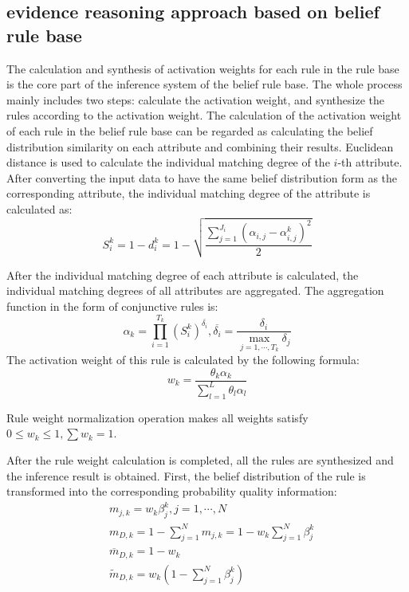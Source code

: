 \documentclass{ieeeaccess}
\begin{document}
\subsection{evidence reasoning approach based on belief rule base}
The calculation and synthesis of activation weights for each rule in the rule base is the core part of the inference system of the belief rule base.
The whole process mainly includes two steps: calculate the activation weight, and synthesize the rules according to the activation weight.
The calculation of the activation weight of each rule in the belief rule base can be regarded as calculating the belief distribution similarity on each attribute and combining their results.
Euclidean distance is used to calculate the individual matching degree of the $i$-th attribute. After converting the input data to have the same belief distribution form as the corresponding attribute,
the individual matching degree of the attribute is calculated as:
\begin{equation}
    S_i^k=1-d_i^k=1-\sqrt{\frac{\sum_{j=1}^{J_i}(\alpha_{i,j}-\alpha_{i,j}^k)^2}{2}}
\end{equation}

After the individual matching degree of each attribute is calculated, the individual matching degrees of all attributes are aggregated. The aggregation function in the form of conjunctive rules is:
\begin{equation}
    \alpha_k=\prod_{i=1}^{T_k}(S_i^k)^{\overline{\delta_i}},\overline{\delta_i}=\frac{\delta_i}{\max_{j=1,\cdots,T_k}\delta_j}
\end{equation}
The activation weight of this rule is calculated by the following formula:
\begin{equation}
    w_k=\frac{\theta_k\alpha_k}{\sum_{l=1}^L\theta_l\alpha_l}
\end{equation}

Rule weight normalization operation makes all weights satisfy $0\leq w_k\leq 1,\sum w_k=1$.

After the rule weight calculation is completed, all the rules are synthesized and the inference result is obtained.
First, the belief distribution of the rule is transformed into the corresponding probability quality information:
\begin{align}
     & m_{j,k}=w_k\beta_j^k,j=1,\cdots,N                          \\
     & m_{D,k}=1-\sum_{j=1}^Nm_{j,k}=1-w_k\sum_{j=1}^{N}\beta_j^k \\
     & \overline{m}_{D,k}=1-w_k                                   \\
     & \widetilde{m}_{D,k}=w_k(1-\sum_{j=1}^N\beta_j^k)
\end{align}
\end{document}
